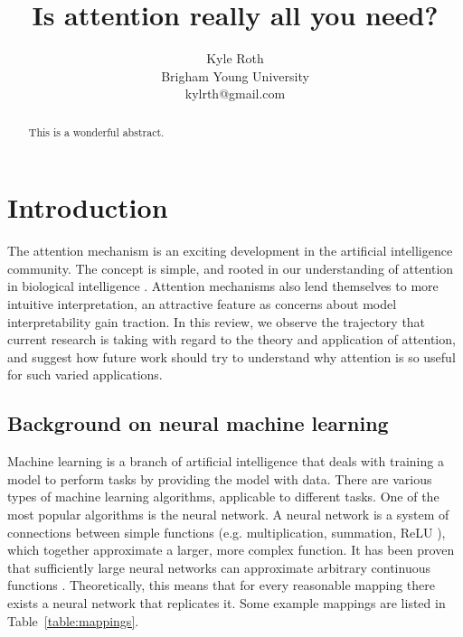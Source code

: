 \documentclass{article}
\title{Is attention really all you need?}
\author{
Kyle Roth\\
\affiliations
Brigham Young University\\
\emails
kylrth@gmail.com
}
\begin{document}
\maketitle

\tableofcontents

\vspace{30px}

\begin{abstract}
This is a wonderful abstract.
\end{abstract}

\section{Introduction}

The attention mechanism is an exciting development in the artificial intelligence community. The concept is simple, and rooted in our understanding of attention in biological intelligence \cite{glimpses,neuroscience-inspired}. Attention mechanisms also lend themselves to more intuitive interpretation, an attractive feature as concerns about model interpretability gain traction. In this review, we observe the trajectory that current research is taking with regard to the theory and application of attention, and suggest how future work should try to understand why attention is so useful for such varied applications.

\subsection{Background on neural machine learning}\label{section:background}

Machine learning is a branch of artificial intelligence that deals with training a model to perform tasks by providing the model with data. There are various types of machine learning algorithms, applicable to different tasks. One of the most popular algorithms is the neural network. A neural network is a system of connections between simple functions (e.g. multiplication, summation, ReLU \cite{relu}), which together approximate a larger, more complex function. It has been proven that sufficiently large neural networks can approximate arbitrary continuous functions \cite{universal_approximators}. Theoretically, this means that for every reasonable mapping there exists a neural network that replicates it. Some example mappings are listed in Table~\ref{table:mappings}.
\end{document}
